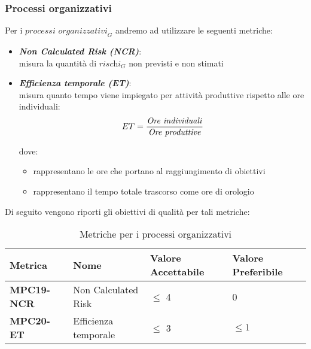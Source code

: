 \subsubsection{Processi organizzativi}
Per i $\textit{processi organizzativi}_G$ andremo ad utilizzare le seguenti metriche:
\begin{itemize}
    \item \textbf{\emph{Non Calculated Risk (NCR)}}:\\
    misura la quantità di $\textit{rischi}_G$ non previsti e non stimati
    \item \textbf{\emph{Efficienza temporale (ET)}}:\\
    misura quanto tempo viene impiegato per attività produttive rispetto alle ore individuali:
    \[
    ET = \frac{\text{\emph{Ore individuali}}}{\text{\emph{{Ore produttive}}}}
    \]

    dove:
    \begin{itemize}
        \item {} rappresentano le ore che portano al raggiungimento di obiettivi
        \item {} rappresentano il tempo totale trascorso come ore di orologio
    \end{itemize}
    \end{itemize}
Di seguito vengono riporti gli obiettivi di qualità per tali metriche:
\begin{table}[htbp]
    \centering
    \begin{tabular}{|>{\centering\arraybackslash}p{4cm}|p{4cm}|p{4cm}|p{4cm}|}
    \hline
    \rowcolor{gray!30}
    \textbf{Metrica} & \textbf{Nome} & \textbf{Valore Accettabile} & \textbf{Valore Preferibile} \\
    \hline
    \rowcolor{gray!10}
    \textbf{MPC19-NCR} & Non Calculated Risk & $\leq$ 4 & 0 \\
    \hline
    \rowcolor{gray!10}
    \textbf{MPC20-ET} & Efficienza temporale & $\leq$ 3 & $\leq 1$ \\
    \hline
    \end{tabular}
    \caption{Metriche per i processi organizzativi}
    \label{tab:metriche_fornitura}
\end{table}


